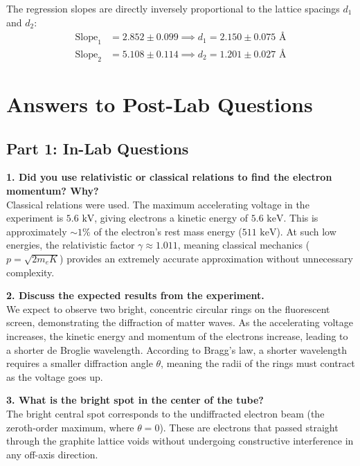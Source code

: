 \documentclass[a4paper,11pt]{article}
\begin{document}
The regression slopes are directly inversely proportional to the lattice spacings $d_1$ and $d_2$:
\begin{align*}
    \text{Slope}_1 &= 2.852 \pm 0.099 \implies d_1 = 2.150 \pm 0.075\text{ \AA} \\
    \text{Slope}_2 &= 5.108 \pm 0.114 \implies d_2 = 1.201 \pm 0.027\text{ \AA}
\end{align*}

\section{Answers to Post-Lab Questions}

\subsection*{Part 1: In-Lab Questions}
\noindent\textbf{1. Did you use relativistic or classical relations to find the electron momentum? Why?} \\
Classical relations were used. The maximum accelerating voltage in the experiment is $5.6\text{ kV}$, giving electrons a kinetic energy of $5.6\text{ keV}$. This is approximately $\sim 1\%$ of the electron's rest mass energy ($511\text{ keV}$). At such low energies, the relativistic factor $\gamma \approx 1.011$, meaning classical mechanics ($p = \sqrt{2 m_e K}$) provides an extremely accurate approximation without unnecessary complexity.

\noindent\textbf{2. Discuss the expected results from the experiment.} \\
We expect to observe two bright, concentric circular rings on the fluorescent screen, demonstrating the diffraction of matter waves. As the accelerating voltage increases, the kinetic energy and momentum of the electrons increase, leading to a shorter de Broglie wavelength. According to Bragg's law, a shorter wavelength requires a smaller diffraction angle $\theta$, meaning the radii of the rings must contract as the voltage goes up.

\noindent\textbf{3. What is the bright spot in the center of the tube?} \\
The bright central spot corresponds to the undiffracted electron beam (the zeroth-order maximum, where $\theta = 0$). These are electrons that passed straight through the graphite lattice voids without undergoing constructive interference in any off-axis direction.
\end{document}
